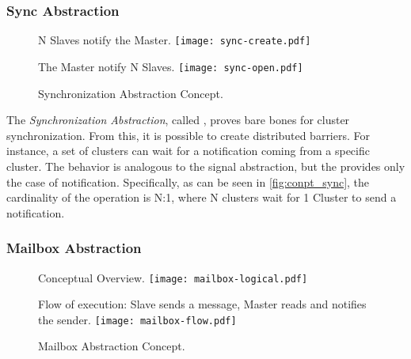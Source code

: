 			\subsubsection*{Sync Abstraction}
			\label{sec.sync-abs}

				\begin{figure}[t]
					\centering%
					\caption{Synchronization Abstraction Concept.}%
					\label{fig:conpt_sync}%

						{N Slaves notify the Master.}%
						{\texttt{[image: sync-create.pdf]}}%

					\hfill

						{The Master notify N Slaves.}%
						{\texttt{[image: sync-open.pdf]}}%

				\end{figure}

				The \textit{Synchronization Abstraction}, called \sync, proves bare bones
				for cluster synchronization.
				From this, it is possible to create distributed barriers.
				For instance, a set of clusters can wait for a notification coming
				from a specific cluster.
				The behavior is analogous to the \posix signal abstraction, but the \sync
				provides only the case of notification.
				Specifically, as can be seen in \autoref{fig:conpt_sync}, the
				cardinality of the operation is N:1, where N clusters wait for 1 Cluster
				to send a notification.

			\subsubsection*{Mailbox Abstraction}
			\label{sec.mailbox-abs}

				\begin{figure}[t]
					\centering%
					\caption{Mailbox Abstraction Concept.}%
					\label{fig:conpt_mailbox}%

						{Conceptual Overview.}%
						{\texttt{[image: mailbox-logical.pdf]}}%

					\hfill

						{Flow of execution: Slave sends a message, Master reads and notifies the sender.}%
						{\texttt{[image: mailbox-flow.pdf]}}%

				\end{figure}

